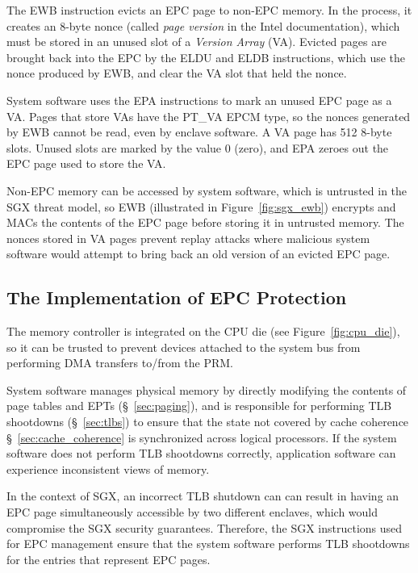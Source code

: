 
The EWB instruction evicts an EPC page to non-EPC memory. In the process, it
creates an 8-byte nonce (called \textit{page version} in the Intel
documentation), which must be stored in an unused slot of a \textit{Version
Array} (VA). Evicted pages are brought back into the EPC by the ELDU and ELDB
instructions, which use the nonce produced by EWB, and clear the VA slot that
held the nonce.

System software uses the EPA instructions to mark an unused EPC page as a VA.
Pages that store VAs have the PT\_VA EPCM type, so the nonces generated by EWB
cannot be read, even by enclave software.  A VA page has 512 8-byte slots.
Unused slots are marked by the value 0 (zero), and EPA zeroes out the EPC page
used to store the VA.

Non-EPC memory can be accessed by system software, which is untrusted in the
SGX threat model, so EWB (illustrated in Figure~\ref{fig:sgx_ewb}) encrypts and
MACs the contents of the EPC page before storing it in untrusted memory. The
nonces stored in VA pages prevent replay attacks where malicious system
software would attempt to bring back an old version of an evicted EPC page.


\subsection {The Implementation of EPC Protection}

The memory controller is
integrated on the CPU die (see Figure~\ref{fig:cpu_die}), so it can be trusted
to prevent devices attached to the system bus from performing DMA transfers
to/from the PRM.

System software manages physical memory by directly modifying the contents of
page tables and EPTs (\S~\ref{sec:paging}), and is responsible for performing
TLB shootdowns (\S~\ref{sec:tlbs}) to ensure that the state not covered by
cache coherence \S~\ref{sec:cache_coherence} is synchronized across logical
processors. If the system software does not perform TLB shootdowns correctly,
application software can experience inconsistent views of memory.

In the context of SGX, an incorrect TLB shutdown can can result in having an
EPC page simultaneously accessible by two different enclaves, which would
compromise the SGX security guarantees. Therefore, the SGX instructions used
for EPC management ensure that the system software performs TLB shootdowns for
the entries that represent EPC pages.

